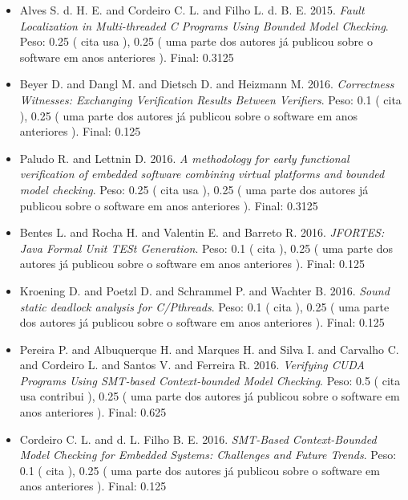 \begin{itemize}
\item Alves S. d. H. E. and Cordeiro C. L. and Filho L. d. B. E.
      2015.
        \textit{ Fault Localization in Multi-threaded C Programs Using Bounded Model Checking}.
      Peso:
      0.25 (
          cita
          usa
      ),
      0.25 (
uma parte dos autores já publicou sobre o software em anos anteriores
      ).
      Final:
      0.3125

\item Beyer D. and Dangl M. and Dietsch D. and Heizmann M.
      2016.
        \textit{ Correctness Witnesses: Exchanging Verification Results Between Verifiers}.
      Peso:
      0.1 (
          cita
      ),
      0.25 (
uma parte dos autores já publicou sobre o software em anos anteriores
      ).
      Final:
      0.125

\item Paludo R. and Lettnin D.
      2016.
        \textit{ A methodology for early functional verification of embedded software combining virtual platforms and bounded model checking}.
      Peso:
      0.25 (
          cita
          usa
      ),
      0.25 (
uma parte dos autores já publicou sobre o software em anos anteriores
      ).
      Final:
      0.3125

\item Bentes L. and Rocha H. and Valentin E. and Barreto R.
      2016.
        \textit{ JFORTES: Java Formal Unit TESt Generation}.
      Peso:
      0.1 (
          cita
      ),
      0.25 (
uma parte dos autores já publicou sobre o software em anos anteriores
      ).
      Final:
      0.125

\item Kroening D. and Poetzl D. and Schrammel P. and Wachter B.
      2016.
        \textit{ Sound static deadlock analysis for C/Pthreads}.
      Peso:
      0.1 (
          cita
      ),
      0.25 (
uma parte dos autores já publicou sobre o software em anos anteriores
      ).
      Final:
      0.125

\item Pereira P. and Albuquerque H. and Marques H. and Silva I. and Carvalho C. and Cordeiro L. and Santos V. and Ferreira R.
      2016.
        \textit{ Verifying CUDA Programs Using SMT-based Context-bounded Model Checking}.
      Peso:
      0.5 (
          cita
          usa
          contribui
      ),
      0.25 (
uma parte dos autores já publicou sobre o software em anos anteriores
      ).
      Final:
      0.625

\item Cordeiro C. L. and d. L. Filho B. E.
      2016.
        \textit{ SMT-Based Context-Bounded Model Checking for Embedded Systems: Challenges and Future Trends}.
      Peso:
      0.1 (
          cita
      ),
      0.25 (
uma parte dos autores já publicou sobre o software em anos anteriores
      ).
      Final:
      0.125


\end{itemize}
